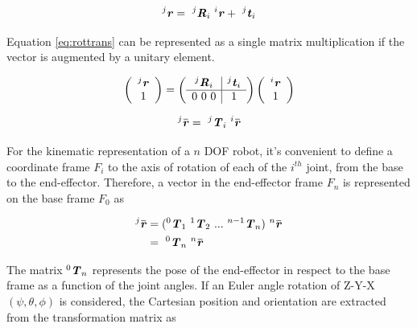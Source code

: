 \documentclass[11pt]{article}
\newcommand{\overbar}[1]{\mkern 1.5mu\overline{\mkern-1.5mu#1\mkern-1.5mu}\mkern 1.5mu}
\newcommand{\mbi}[1]{\textbf{\emph{#1}}}
\begin{document}
        \begin{equation}
        ^j\mbi{r} =\ ^j\mbi{R}_i\ ^i\mbi{r} +\ ^j\mbi{t}_i
        \label{eq:rottrans}
        \end{equation}
        
        Equation \ref{eq:rottrans} can be represented as a single matrix multiplication if the vector is augmented by a unitary element. 
        
        \begin{equation}
            \left( 
            \begin{array}{c}
                ^j\mbi{r} \\
                1
            \end{array} 
            \right)
            = \left(
            \begin{array}{c|c}
                ^j\mbi{R}_i & ^j\mbi{t}_i \\ \hline
                0\ 0\ 0 & 1
            \end{array}
            \right)
            \left(
            \begin{array}{c}
                ^i\mbi{r} \\
                1
            \end{array}
            \right)
        \end{equation}
        
        \begin{equation}
            ^j\overbar{\mbi{r}} =\ ^j\mbi{T}_i\ ^i\overbar{\mbi{r}}
        \end{equation}

        For the kinematic representation of a $n$ DOF robot, it's convenient to define a coordinate frame $F_i$ to the axis of rotation of each of the $i^{th}$ joint, from the base to the end-effector. Therefore, a vector in the end-effector frame $F_n$ is represented on the base frame $F_0$ as

        \begin{align}
        ^j\overbar{\mbi{r}} & = (^0\mbi{T}_1\ ^1\mbi{T}_2\ ...\ ^{n-1}\mbi{T}_n)\ ^n\overbar{\mbi{r}} \\
        & =\ ^0\mbi{T}_n\ ^n\overbar{\mbi{r}}
        \end{align}
        
        The matrix $^0\mbi{T}_n$ represents the pose of the end-effector in respect to the base frame as a function of the joint angles. If an Euler angle rotation of Z-Y-X $(\psi, \theta, \phi)$ is considered, the Cartesian position and orientation are extracted from the transformation matrix as
        
\end{document}
